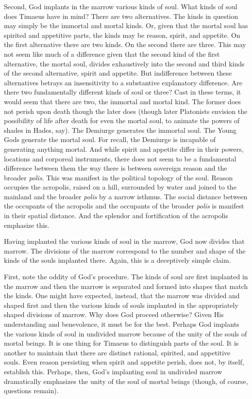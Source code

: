 Second, God implants in the marrow various kinds of soul. What kinds of soul does Timaeus have in mind? There are two alternatives. The kinds in question may simply be the immortal and mortal kinds. Or, given that the mortal soul has spirited and appetitive parts, the kinds may be reason, spirit, and appetite. On the first alternative there are two kinds. On the second there are three. This may not seem like much of a difference given that the second kind of the first alternative, the mortal soul, divides exhaustively into the second and third kinds of the second alternative, spirit and appetite. But indifference between these alternatives betrays an insensitivity to a substantive explanatory difference. Are there two fundamentally different kinds of soul or three? Cast in these terms, it would seem that there are two, the immortal and mortal kind. The former does not perish upon death though the later does (though later Platonists envision the possibility of life after death for even the mortal soul, to animate the powers of shades in Hades, say). The Demiurge generates the immortal soul. The Young Gods generate the mortal soul. For recall, the Demiurge is incapable of generating anything mortal. And while spirit and appetite differ in their powers, locations and corporeal instruments, there does not seem to be a fundamental difference between them the way there is between sovereign reason and the broader \emph{polis}. This was manifest in the political topology of the soul. Reason occupies the acropolis, raised on a hill, surrounded by water and joined to the mainland and the broader \emph{polis} by a narrow isthmus. The social distance between the occupants of the acropolis and the occupants of the broader \emph{polis} is manifest in their spatial distance. And the splendor and fortification of the acropolis emphasize this. 

Having implanted the various kinds of soul in the marrow, God now divides that marrow. The divisions of the marrow correspond to the number and shape of the kinds of the souls implanted there. Again, this is a deceptively simple claim.

First, note the oddity of God's procedure. The kinds of soul are first implanted in the marrow and then the marrow is separated and formed into shapes that match the kinds. One might have expected, instead, that the marrow was divided and shaped first and then the various kinds of souls implanted in the appropriately shaped divisions of marrow. Why does God proceed otherwise? Given His understanding and benevolence, it must be for the best. Perhaps God implants the various kinds of soul in undivided marrow because of the unity of the souls of mortal beings. It is one thing for Timaeus to distinguish parts of the soul. It is another to maintain that there are distinct rational, spirited, and appetitive souls. Even reason persisting when spirit and appetite perish, does not, by itself, establish this. Perhaps, then, God's implanting soul in undivided marrow dramatically emphasizes the unity of the soul of mortal beings (though, of course, questions remain).

